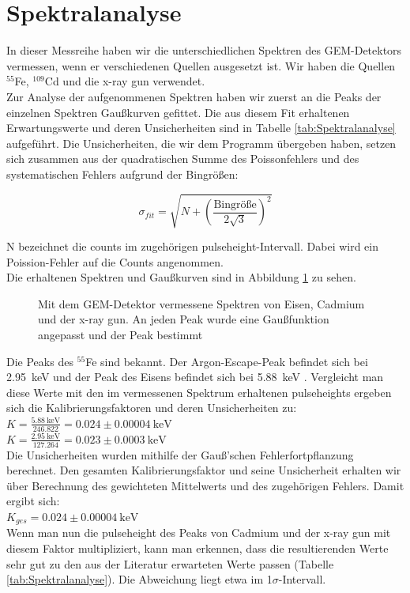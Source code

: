 \section{Spektralanalyse}

In dieser Messreihe haben wir die unterschiedlichen Spektren des GEM-Detektors vermessen, wenn er verschiedenen Quellen ausgesetzt ist. Wir haben die Quellen $^{55}$Fe, $^{109}$Cd und die x-ray gun verwendet. \\ 
Zur Analyse der aufgenommenen Spektren haben wir zuerst an die Peaks der einzelnen Spektren Gaußkurven gefittet. Die aus diesem Fit erhaltenen Erwartungswerte und deren Unsicherheiten sind in Tabelle \ref{tab:Spektralanalyse} aufgeführt. Die Unsicherheiten, die wir dem Programm übergeben haben, setzen sich zusammen aus der quadratischen Summe des Poissonfehlers und des systematischen Fehlers aufgrund der Bingrößen: 


\begin{equation}
    \boxed{ \sigma_{fit} = \sqrt{N + \left(\frac{\text{Bingröße}}{2\sqrt3}\right)^2}}
    \label{eq:sigma_mu}
\end{equation}

N bezeichnet die counts im zugehörigen pulseheight-Intervall. Dabei wird ein Poission-Fehler auf die Counts angenommen. \\

Die erhaltenen Spektren und Gaußkurven sind in Abbildung \ref{fig:Spektren} zu sehen. 


\begin{figure}[h]
    \centering
    
    \caption{Mit dem GEM-Detektor vermessene Spektren von Eisen, Cadmium und der x-ray gun. An jeden Peak wurde eine Gaußfunktion angepasst und der Peak bestimmt}
    \label{fig:Spektren}
    
\end{figure}


Die Peaks des $^{55}$Fe sind bekannt. Der Argon-Escape-Peak befindet sich bei \SI{2.95}{\keV} und der Peak des Eisens befindet sich bei \SI{5.88}{\keV} \cite{Vorlesungsfolien}. Vergleicht man diese Werte mit den im vermessenen Spektrum erhaltenen pulseheights ergeben sich die Kalibrierungsfaktoren und deren Unsicherheiten zu: \\
$K=\frac{\SI{5.88}{\keV}}{246.822} = 0.024 \pm \SI{0.00004}{\keV}$ \\  
$K=\frac{\SI{2.95}{\keV}}{127.264} = 0.023 \pm \SI{0.0003}{\keV}$ \\
Die Unsicherheiten wurden mithilfe der Gauß'schen Fehlerfortpflanzung berechnet. 
Den gesamten Kalibrierungsfaktor und seine Unsicherheit erhalten wir über Berechnung des gewichteten Mittelwerts und des zugehörigen Fehlers. Damit ergibt sich: \\ 
$K_{ges} = 0.024 \pm \SI{0.00004}{\keV}$ \\ 
Wenn man nun die pulseheight des Peaks von Cadmium und der x-ray gun mit diesem Faktor multipliziert, kann man erkennen, dass die resultierenden Werte sehr gut zu den aus der Literatur erwarteten Werte passen (Tabelle \ref{tab:Spektralanalyse}). Die Abweichung liegt etwa im 1$\sigma$-Intervall. 

